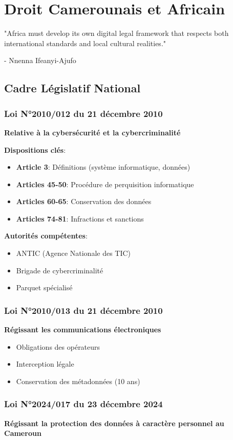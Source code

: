\chapter{Droit Camerounais et Africain}
\epigraph{"Africa must develop its own digital legal framework that respects both international standards and local cultural realities."}{- Nnenna Ifeanyi-Ajufo}
\section{Cadre Législatif National}
\subsection{Loi N°2010/012 du 21 décembre 2010}
\textbf{Relative à la cybersécurité et la cybercriminalité}

\textbf{Dispositions clés}:

\begin{itemize}
\item \textbf{Article 3}: Définitions (système informatique, données)
\item \textbf{Articles 45-50}: Procédure de perquisition informatique
\item \textbf{Articles 60-65}: Conservation des données
\item \textbf{Articles 74-81}: Infractions et sanctions
\end{itemize}

\textbf{Autorités compétentes}:

\begin{itemize}
\item ANTIC (Agence Nationale des TIC)
\item Brigade de cybercriminalité
\item Parquet spécialisé
\end{itemize}

\subsection{Loi N°2010/013 du 21 décembre 2010}
\textbf{Régissant les communications électroniques}
\begin{itemize}
\item Obligations des opérateurs
\item Interception légale
\item Conservation des métadonnées (10 ans)
\end{itemize}


\subsection{Loi N°2024/017 du 23 décembre 2024}
\textbf{Régissant la protection des données à caractère personnel au Cameroun}

